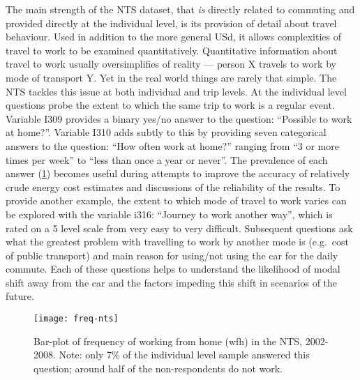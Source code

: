 The main strength of the NTS dataset, that \emph{is} directly related to
commuting and provided directly at the individual level, is its provision of
detail about travel behaviour. Used in addition to the more general USd, it
allows complexities of travel to work to be examined quantitatively.
Quantitative information about travel to work usually oversimplifies of
reality --- person X travels to work by mode of transport Y. Yet in the real
world things are rarely that simple.
The NTS
tackles this issue at both individual and trip levels. At the individual level
questions probe the extent to which the same trip to work is a regular event.
Variable I309 provides a binary yes/no answer to the question: ``Possible to
work at home?''. Variable I310 adds subtly to this by providing seven
categorical answers to the question: ``How often work at home?'' ranging from
``3 or more times per week'' to ``less than once a year or never''. The
prevalence of each answer (\cref{ffreq-nts}) becomes useful during attempts to
improve the accuracy of relatively crude energy cost estimates %
and discussions of the  
reliability of the results. %
To provide another example, the extent to which mode of travel to work varies
can be explored with the variable i316: ``Journey to work another
way'', which is rated on a 5 level scale from very easy to very difficult.
Subsequent questions ask what the greatest problem with travelling to work by
another mode is (e.g.~cost of public transport) and main reason for using/not
using the car for the daily commute. Each of these questions helps to
understand the likelihood of modal shift away from the car and the factors
impeding this shift in scenarios of the future.
\begin{figure}
\texttt{[image: freq-nts]}
\caption[Bar-plot of frequency of working from home]{Bar-plot of frequency of
working from home (wfh) in the NTS, 2002-2008. Note: only 7\% of the
individual level sample answered this question; around half of the
non-respondents do not work.}
\label{ffreq-nts}
\end{figure}


